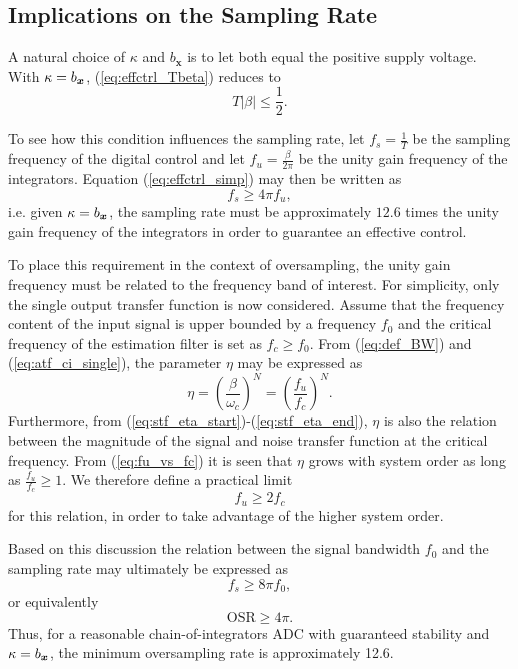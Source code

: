 \subsection{Implications on the Sampling Rate}
A natural choice of $\kappa$ and $b_{\bm{x}}$ is to let both equal the positive supply voltage. With $\kappa = b_{\bm{x}}$, (\ref{eq:effctrl_Tbeta}) reduces to
\begin{equation}
    \label{eq:effctrl_simp}
    T|\beta| \leq \frac{1}{2}.
\end{equation}

To see how this condition influences the sampling rate, let $f_s = \frac{1}{T}$ be the sampling frequency of the digital control and let $f_u = \frac{\beta}{2 \pi}$ be the unity gain frequency of the integrators. Equation (\ref{eq:effctrl_simp}) may then be written as
\begin{equation}
    \label{eq:fs4fu}
    f_s \geq 4 \pi f_u,
\end{equation}
i.e. given $\kappa = b_{\bm{x}}$, the sampling rate must be approximately $12.6$ times the unity gain frequency of the integrators in order to guarantee an effective control.

To place this requirement in the context of oversampling, the unity gain frequency must be related to the frequency band of interest. For simplicity, only the single output transfer function is now considered. Assume that the frequency content of the input signal is upper bounded by a frequency $f_0$ and the critical frequency of the estimation filter is set as $f_c \geq f_0$. From (\ref{eq:def_BW}) and (\ref{eq:atf_ci_single}), the parameter $\eta$ may be expressed as
\begin{equation}
    \label{eq:fu_vs_fc}
    \eta = \left(\frac{\beta}{\omega_c}\right)^{N} = \left( \frac{f_u}{f_c} \right)^N.
\end{equation}
Furthermore, from (\ref{eq:stf_eta_start})-(\ref{eq:stf_eta_end}), $\eta$ is also the relation between the magnitude of the signal and noise transfer function at the critical frequency. From (\ref{eq:fu_vs_fc}) it is seen that $\eta$ grows with system order as long as $\frac{f_u}{f_c} \geq 1$. We therefore define a practical limit
\begin{equation}
    f_u \geq 2f_c
\end{equation}
for this relation, in order to take advantage of the higher system order.

Based on this discussion the relation between the signal bandwidth $f_0$ and the sampling rate may ultimately be expressed as
\begin{equation}
    f_s \geq 8 \pi f_0,
\end{equation}
or equivalently
\begin{equation}
    \text{OSR} \geq 4\pi.
\end{equation}
Thus, for a reasonable chain-of-integrators ADC with guaranteed stability and $\kappa=b_{\bm{x}}$, the minimum oversampling rate is approximately 12.6.


